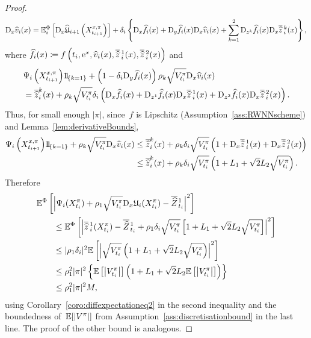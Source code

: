 \begin{proof}
\begin{equation}
        \mathrm{D}_{x} \widehat v_i(x) =  \mathbb{E}^\Phi_{i}\left[\mathrm{D}_{x}\widehat{\mathfrak{U}}_{i+1}\left(X^{x,\pi}_{t_{i+1}}\right)\right] + \delta_{i} \left\{\mathrm{D}_{x} \widehat f_i(x) + \mathrm{D}_y \widehat f_i(x)\mathrm{D}_{x} \widehat v_i(x)
        + \sum_{k=1}^{2}\mathrm{D}_{z^k} \widehat f_i(x) \mathrm{D}_{x} \overline{\widehat{z}}\,^{k}_{i}(x)\right\},
    \end{equation}
    where $\widehat f_i(x) \coloneqq  f\left(t_i, \mathrm{e}^{x}, \widehat{v}_{i}(x), \overline{\widehat{z}}\,^{1}_{i}(x), \overline{\widehat{z}}\,^{2}_{i}(x)\right)$ and
    \begin{align*}
        & \Psi_i\left(X^{x,\pi}_{t_{i+1}}\right)\ind_{\{k=1\}} + \left(1-\Deli \Dr_y\widehat f_i(x)\right)\rho_k\sqrt{V^{\pi}_{t_i}}\Dx \widehat v_i(x) \\
        & = \overline{\widehat{z}}^k_{i}(x)  + \rho_k\sqrt{V^{\pi}_{t_i}}\Deli \left(\Dx \widehat f_i(x) + \Dr_{z^1} \widehat f_i(x) \Dx \zowO_{i}(x) + \Dr_{z^2} \widehat f_i(x)\Dx \zowT_{i}(x)\right).
    \end{align*}
    Thus, for small enough $|\pi|$, since~$f$ is Lipschitz  (Assumption~\ref{ass:RWNNscheme}) and Lemma~\ref{lem:derivativeBounds}, 
    \begin{align*}
        \Psi_i\left(X^{x,\pi}_{t_{i+1}}\right)\ind_{\{k=1\}} + \rho_k\sqrt{V^{\pi}_{t_i}}\Dx \widehat v_i(x) &\leq \overline{\widehat{z}}^k_{i}(x) + \rho_k\Deli  \sqrt{V^{\pi}_{t_i}}\left(1+\Dx \zowO_{i}(x) + \Dx \zowT_{i}(x)\right) \\
        &\leq \overline{\widehat{z}}^k_{i}(x) + \rho_k\Deli \sqrt{V^{\pi}_{t_i}}\left(1 + L_1 + \sqrt{2} L_2 \sqrt{V^{\pi}_{t_i}}\right).
    \end{align*}
Therefore
\begin{align*}
 & \mathbb{E}^\Phi\left[\left| \Psi_i(X^\pi_{t_i}) + \rho_1\sqrt{V^\pi_{t_i}}\mathrm{D}_{x}\mathfrak{U}_i(X^\pi_{t_i}) - \overline{\widehat{Z}}\kern0.1em^{1}_{t_i}\right|^2 \right]  \\
    &\qquad \leq 
    \mathbb{E}^\Phi\left[\left| \overline{\widehat{z}}\,^{1}_{i}(X^\pi_{t_i}) - \overline{\widehat{Z}}\kern0.1em^{1}_{t_i} + \rho_1\delta_{i} \sqrt{V^\pi_{t_i}}\left[1 + L_1 + \sqrt{2} L_2 \sqrt{V^\pi_{t_i}}\right]\right|^2 \right] \\
    &\qquad \leq 
    |\rho_1\delta_{i} |^2 \mathbb{E}\left[\left|  \sqrt{V^\pi_{t_i}}\left(1+L_1+\sqrt{2}L_2\sqrt{V^\pi_{t_i}}\right)\right|^2 \right] \\
    &\qquad \leq 
    \rho_1^2|\pi|^2 \left\{\mathbb{E}\left[\left|V^\pi_{t_i}\right| \right]\left(1 + L_1 + \sqrt{2}L_2\mathbb{E}\left[\left|V^\pi_{t_i}\right| \right]\right)\right\} \\
    & \qquad \leq \rho_1^2|\pi|^2 M,
\end{align*}
using Corollary~\ref{coro:diffexpectationeq2} in the second inequality and the boundedness of~$\mathbb{E}[|V^{\pi}|]$ from Assumption~\ref{ass:discretisationbound}
in the last line.
The proof of the other bound is analogous.
\end{proof}

